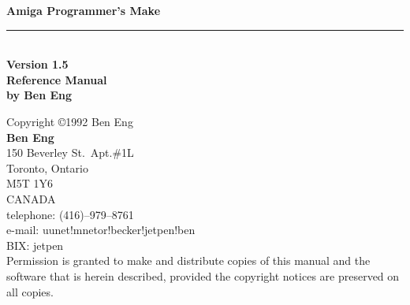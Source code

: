 


\begin{titlepage}
	\vspace*{1.0in}
	\begin{flushright}
		{\huge\bf Amiga Programmer's Make} \\[.25cm]
		{\rule[.1in]{4.5in}{.02in}}\\[.25cm]
		{\large\bf Version 1.5} \\[2.0cm]
		{\large\bf Reference Manual} \\[4.0cm]
		{\bf by Ben Eng}\\
    \end{flushright}
	\newpage
	\thispagestyle{empty}
	\vspace*{\fill}
	\begin{flushleft}
		{Copyright \copyright 1992 Ben Eng}\\[2.0cm]
		{\bf Ben Eng}\\[.25cm]
		{150 Beverley St.\ Apt.\#{}1L}\\
		{Toronto, Ontario}\\
		{M5T 1Y6}\\
		{CANADA}\\[2.0cm]
		{telephone: (416)--979--8761}\\
		{e-mail:  uunet!mnetor!becker!jetpen!ben}\\
		{BIX: jetpen}\\[2.0cm]
{Permission is granted to make and distribute copies of this
manual and the software that is herein described, provided the copyright
notices are preserved on all copies.}\\
    \end{flushleft}
\end{titlepage}

\setcounter{page}{1}
\tableofcontents
\renewcommand{\thepage}{\arabic{page}}

\begin{abstract}
Make is a programming utility used to automate the process of recompiling
multiple interdependent source files into an output file (the goal).  The
Make program uses rules of inference to make the goal.  The rules for
making the goal are explicitly stated in an input file called the Makefile,
and implicitly determined from builtin rules.  Normally, the Makefile for a
goal is written so that the only thing that needs to be done to recompile
newly modified source files is to run the Make program.
\end{abstract}

